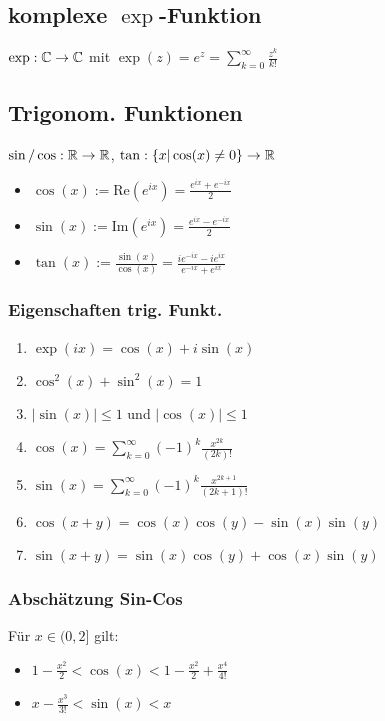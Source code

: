 \subsection*{komplexe \texorpdfstring{$\exp$}{Exponential}-Funktion}
$\exp: \mathbb C \rightarrow \mathbb C$ mit $\exp(z) = e^z = \sum\limits_{k = 0}^\infty \frac{z^k}{k!}$
\subsection*{Trigonom. Funktionen}
$\sin/\cos: \mathbb R \rightarrow \mathbb R$, $\tan: \{x| \cos(x) \neq 0\} \rightarrow \mathbb R$
\begin{itemize}[noitemsep]
    \item $\cos(x) := \text{Re}(e^{ix}) = \frac{e^{ix} + e^{-ix}}{2}$
    \item $\sin(x) := \text{Im}(e^{ix}) = \frac{e^{ix} - e^{-ix}}{2}$
    \item $\tan(x) := \frac{\sin(x)}{\cos(x)} = \frac{ie^{-ix} - ie^{ix}}{e^{-ix} + e^{ix}}$
\end{itemize}
\subsubsection*{Eigenschaften trig. Funkt.}
\begin{enumerate}[label=\alph*., noitemsep]
    \item $\exp(ix) = \cos(x) + i \sin(x)$
    \item $\cos^2(x) + \sin^2(x) = 1$
    \item $|\sin(x)| \leq 1$ und $|\cos(x)| \leq 1$
    \item $\cos(x) = \sum\limits_{k = 0}^\infty (-1)^k \frac{x^{2k}}{(2k)!}$
    \item $\sin(x) = \sum\limits_{k = 0}^{\infty} (-1)^k \frac{x^{2k +1}}{(2k + 1)!}$
    \item $\cos(x + y) = \cos(x) \cos(y) - \sin(x) \sin(y)$
    \item $\sin(x + y) =  \sin(x) \cos(y) + \cos(x)\sin(y)$
\end{enumerate}
\subsubsection*{Abschätzung Sin-Cos}
Für $x \in (0, 2]$ gilt:
\begin{itemize}[leftmargin=*, noitemsep]
    \item $1 - \frac{x^2}{2} < \cos(x) < 1 - \frac{x^2}{2} + \frac{x^4}{4!}$
    \item $x - \frac{x^3}{3!} < \sin(x) < x$
\end{itemize}

